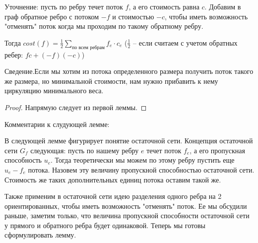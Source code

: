 Уточнение: пусть по ребру течет поток $f$, а его стоимость равна $c$. Добавим в граф обратное ребро с потоком $-f$ и стоимостью $-c$, чтобы иметь возможность "отменять" поток когда мы проходим по такому обратному ребру.

Тогда $cost(f) = \frac{1}{2}\sum_{\text {по всем ребрам}} f_e\cdot c_e$ ($\frac{1}{2}$ -- если считаем с учетом обратных ребер: $fc + (-f)(-c)$)

\begin{lemma}
	Сведение.Если мы хотим из потока определенного размера получить поток такого же размера, но минимальной стоимости, нам нужно прибавить к нему циркуляцию минимального веса.
\end{lemma}
\begin{proof}
	Напрямую следует из первой леммы.
\end{proof}

Комментарии к слудующей лемме:
	
В следующей лемме фигурирует понятие остаточной сети. Концепция остаточной сети $G_f$ следующая: пусть по нашему ребру $e$ течет поток $f_e$, а его пропускная способность $u_e$. Тогда теоретически мы можем по этому ребру пустить еще $u_e - f_e$ потока. Назовем эту величину 
пропускной способностью остаточной сети. Стоимость же таких дополнительных единиц потока оставим такой же.

Также применим в остаточной сети идею разделения одного ребра на 2 ориентированных, чтобы иметь возможность "отменять" поток. Ее мы обсудили раньше, заметим только, что величина пропускной способности остаточной 
сети у прямого и обратного ребра будет одинаковой. Теперь мы готовы сформулировать лемму.

